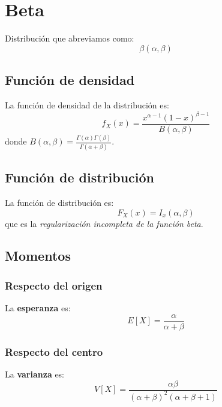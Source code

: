 \section{Beta}
\label{sec:beta}
Distribución que abreviamos como:
\[
\boxed{\beta\left( \alpha, \beta \right)}
\]

\subsection{Función de densidad}
La función de densidad de la distribución es:
\[
f_X \left( x \right) = \frac{x^{\alpha - 1} \left( 1 - x \right)^{\beta - 1}}{B\left( \alpha, \beta \right)}
\]
donde $B\left( \alpha, \beta \right) = \frac{\Gamma\left( \alpha \right)\Gamma\left( \beta \right)}{\Gamma\left( \alpha + \beta \right)}$.

\subsection{Función de distribución}
La función de distribución es:
\[
F_X\left( x \right) = I_x\left( \alpha, \beta \right)
\]
que es la \textit{regularización incompleta de la función beta}.%

\subsection{Momentos}

\subsubsection*{Respecto del origen}
La \textbf{esperanza} es: 
\[
    E\left[ X \right] = \frac{\alpha}{\alpha + \beta}
\]
\subsubsection*{Respecto del centro}
La \textbf{varianza} es:
\[
    V\left[ X \right] = \frac{\alpha \beta}{\left( \alpha + \beta \right)^2 \left( \alpha + \beta + 1 \right)}
\]

